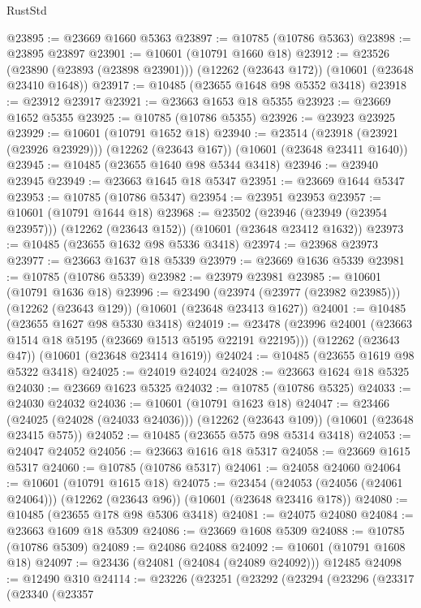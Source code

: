 \begin{lexlean}{RustStd}
\begin{coremodule}
@23895 := @23669 @1660 @5363
@23897 := @10785 (@10786 @5363)
@23898 := @23895 @23897
@23901 := @10601 (@10791 @1660 @18)
@23912 := @23526
    (@23890 (@23893 (@23898 @23901)))
    (@12262 (@23643 @172))
    (@10601 (@23648 @23410 @1648))
@23917 := @10485 (@23655 @1648 @98 @5352 @3418)
@23918 := @23912 @23917
@23921 := @23663 @1653 @18 @5355
@23923 := @23669 @1652 @5355
@23925 := @10785 (@10786 @5355)
@23926 := @23923 @23925
@23929 := @10601 (@10791 @1652 @18)
@23940 := @23514
    (@23918 (@23921 (@23926 @23929)))
    (@12262 (@23643 @167))
    (@10601 (@23648 @23411 @1640))
@23945 := @10485 (@23655 @1640 @98 @5344 @3418)
@23946 := @23940 @23945
@23949 := @23663 @1645 @18 @5347
@23951 := @23669 @1644 @5347
@23953 := @10785 (@10786 @5347)
@23954 := @23951 @23953
@23957 := @10601 (@10791 @1644 @18)
@23968 := @23502
    (@23946 (@23949 (@23954 @23957)))
    (@12262 (@23643 @152))
    (@10601 (@23648 @23412 @1632))
@23973 := @10485 (@23655 @1632 @98 @5336 @3418)
@23974 := @23968 @23973
@23977 := @23663 @1637 @18 @5339
@23979 := @23669 @1636 @5339
@23981 := @10785 (@10786 @5339)
@23982 := @23979 @23981
@23985 := @10601 (@10791 @1636 @18)
@23996 := @23490
    (@23974 (@23977 (@23982 @23985)))
    (@12262 (@23643 @129))
    (@10601 (@23648 @23413 @1627))
@24001 := @10485 (@23655 @1627 @98 @5330 @3418)
@24019 := @23478
    (@23996 @24001 (@23663 @1514 @18 @5195 (@23669 @1513 @5195 @22191 @22195)))
    (@12262 (@23643 @47))
    (@10601 (@23648 @23414 @1619))
@24024 := @10485 (@23655 @1619 @98 @5322 @3418)
@24025 := @24019 @24024
@24028 := @23663 @1624 @18 @5325
@24030 := @23669 @1623 @5325
@24032 := @10785 (@10786 @5325)
@24033 := @24030 @24032
@24036 := @10601 (@10791 @1623 @18)
@24047 := @23466
    (@24025 (@24028 (@24033 @24036)))
    (@12262 (@23643 @109))
    (@10601 (@23648 @23415 @575))
@24052 := @10485 (@23655 @575 @98 @5314 @3418)
@24053 := @24047 @24052
@24056 := @23663 @1616 @18 @5317
@24058 := @23669 @1615 @5317
@24060 := @10785 (@10786 @5317)
@24061 := @24058 @24060
@24064 := @10601 (@10791 @1615 @18)
@24075 := @23454
    (@24053 (@24056 (@24061 @24064)))
    (@12262 (@23643 @96))
    (@10601 (@23648 @23416 @178))
@24080 := @10485 (@23655 @178 @98 @5306 @3418)
@24081 := @24075 @24080
@24084 := @23663 @1609 @18 @5309
@24086 := @23669 @1608 @5309
@24088 := @10785 (@10786 @5309)
@24089 := @24086 @24088
@24092 := @10601 (@10791 @1608 @18)
@24097 := @23436 (@24081 (@24084 (@24089 @24092))) @12485
@24098 := @12490 @310
@24114 := @23226
    (@23251
      (@23292
        (@23294
          (@23296
            (@23317
              (@23340
                (@23357

\end{coremodule}
\end{lexlean}
